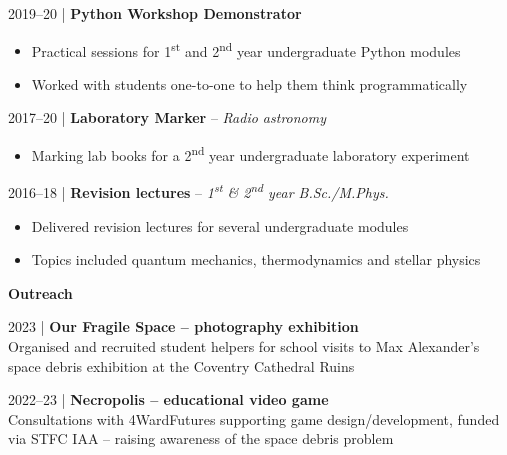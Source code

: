 \documentclass[10pt,a4paper]{altacv}
\begin{document}
\smallskip

\small 2019--20 | \textbf{Python Workshop Demonstrator} \\
\smallskip
\begin{itemize}
	\item Practical sessions for 1\textsuperscript{st} and 2\textsuperscript{nd} year undergraduate Python modules
	\item Worked with students one-to-one to help them think programmatically
\end{itemize}

\smallskip

\small 2017--20 | \textbf{Laboratory Marker} -- \textit{Radio astronomy} \\
\smallskip
\begin{itemize}
	\item Marking lab books for a 2\textsuperscript{nd} year undergraduate laboratory experiment
\end{itemize}

\smallskip

\small 2016--18 | \textbf{Revision lectures} -- \textit{1\textsuperscript{st} \& 2\textsuperscript{nd} year B.Sc./M.Phys.} \\
\smallskip
\begin{itemize}
	\item Delivered revision lectures for several undergraduate modules
	\item Topics included quantum mechanics, thermodynamics and stellar physics
\end{itemize}

\divider


\normalsize \textbf{Outreach}

\medskip

\small 2023 | \textbf{Our Fragile Space -- photography exhibition} \\
\smallskip
Organised and recruited student helpers for school visits to Max Alexander's space debris exhibition at the Coventry Cathedral Ruins

\smallskip

\small 2022--23 | \textbf{Necropolis -- educational video game} \\
\smallskip
Consultations with 4WardFutures supporting game design/development, funded via STFC IAA -- raising awareness of the space debris problem

\smallskip

\end{document}
